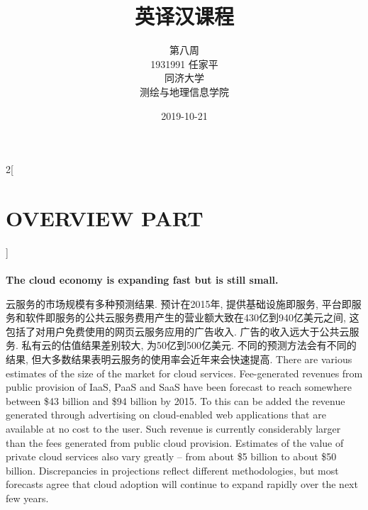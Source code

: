 \documentclass[a4paper, UTF8, 12pt]{article}
\begin{document}
\title{\Huge 英译汉课程}
\author{\Large 
        第八周 \\[12pt]
        1931991 任家平 \\[12pt]
        同济大学 \\[12pt]
        测绘与地理信息学院}
\date{2019-10-21}

\maketitle

\thispagestyle{empty}

\newpage
{}
\tableofcontents
{}

\newpage
{}

\begin{paracol}{2}[\section{OVERVIEW PART\uppercase\expandafter{}}]
    
    \switchcolumn*
    \paragraph{} 
    \switchcolumn
    {\bfseries The cloud economy is expanding fast but is still small.}

    \switchcolumn*
    云服务的市场规模有多种预测结果. 预计在2015年, 提供基础设施即服务, 平台即服务和软件即服务的公共云服务费用产生的营业额大致在430亿到940亿美元之间, 这包括了对用户免费使用的网页云服务应用的广告收入. 广告的收入远大于公共云服务. 私有云的估值结果差别较大, 为50亿到500亿美元. 不同的预测方法会有不同的结果, 但大多数结果表明云服务的使用率会近年来会快速提高.
    \switchcolumn
    There are various estimates of the size of the market for cloud services. Fee-generated revenues from public provision of IaaS, PaaS and SaaS have been forecast to reach somewhere between \$43 billion and \$94 billion by 2015. To this can be added the revenue generated through advertising on cloud-enabled web applications that are available at no cost to the user. Such revenue is currently considerably larger than the fees generated from public cloud provision. Estimates of the value of private cloud services also vary greatly – from about \$5 billion to about \$50 billion. Discrepancies in projections reflect different methodologies, but most forecasts agree that cloud adoption will continue to expand rapidly over the next few years.
    

\end{paracol}
\end{document}
